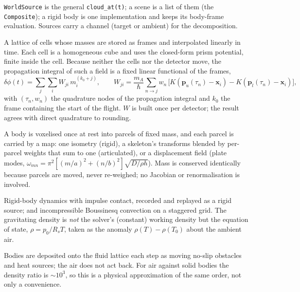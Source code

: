 \documentclass[11pt,a4paper]{article}
\theoremstyle{reqstyle}
\newcommand{\xv}{\mathbf{x}}
\begin{document}
\begin{description}[leftmargin=*,style=nextline]
\item[The seam.] \texttt{WorldSource} is the general \texttt{cloud\_at(t)}; a scene is a
list of them (the \texttt{Composite}); a rigid body is one implementation and keeps its
body-frame evaluation. Sources carry a channel (target or ambient) for the decomposition.
\item[\texttt{CachedField}.] A lattice of cells whose masses are stored as frames and
interpolated linearly in time. Each cell is a homogeneous cube and uses the closed-form prism
potential, finite inside the cell. Because neither the cells nor the detector move, the
propagation integral of such a field is a fixed linear functional of the frames,
\begin{equation}
\delta\phi(t)=\sum_{j}\sum_{i} W_{ji}\,m_i^{(k_0+j)},\qquad
W_{ji}=\frac{m_A}{\hbar}\sum_{n\to j} w_n\,\bigl[K(\mathbf p_u(\tau_n)-\xv_i)-K(\mathbf p_l(\tau_n)-\xv_i)\bigr],
\label{eq:gridresponse}
\end{equation}
with $(\tau_n,w_n)$ the quadrature nodes of the propagation integral and $k_0$ the frame
containing the start of the flight. $W$ is built once per detector; the result agrees with
direct quadrature to rounding.
\item[Prescribed (Category A).] A body is voxelised once at rest into parcels of fixed mass,
and each parcel is carried by a map: one isometry (rigid), a skeleton's transforms blended
by per-parcel weights that sum to one (articulated), or a displacement field (plate modes,
$\omega_{mn}=\pi^2[(m/a)^2+(n/b)^2]\sqrt{D/\rho h}$). Mass is conserved identically because
parcels are moved, never re-weighed; no Jacobian or renormalisation is involved.
\item[Solved (Category B).] Rigid-body dynamics with impulse contact, recorded and replayed
as a rigid source; and incompressible Boussinesq convection on a staggered grid. The
gravitating density is \emph{not} the solver's (constant) working density but the equation of
state, $\rho=p_0/R_sT$, taken as the anomaly $\rho(T)-\rho(T_0)$ about the ambient air.
\item[\texttt{Driver} (one-way coupling).] Bodies are deposited onto the fluid lattice each
step as moving no-slip obstacles and heat sources; the air does not act back. For air against
solid bodies the density ratio is $\sim\!10^3$, so this is a physical approximation of the
same order, not only a convenience.
\end{description}
\end{document}
